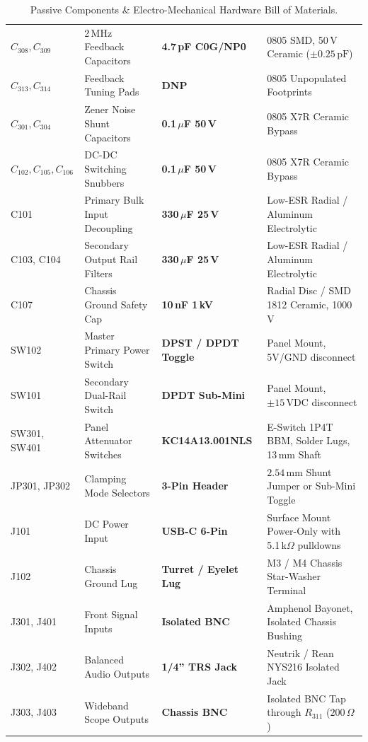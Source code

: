 \documentclass[11pt, letterpaper]{article}
\begin{document}
\begin{table}[H]
\begin{tabularx}{\linewidth}{@{} l l l L @{}}
        $C_{308}, C_{309}$ & 2\,MHz Feedback Capacitors & \textbf{4.7\,pF C0G/NP0} & 0805 SMD, 50\,V Ceramic ($\pm 0.25\,\text{pF}$) \\
        $C_{313}, C_{314}$ & Feedback Tuning Pads & \textbf{DNP} & 0805 Unpopulated Footprints \\
        $C_{301}, C_{304}$ & Zener Noise Shunt Capacitors & \textbf{0.1\,$\mu$F 50\,V} & 0805 X7R Ceramic Bypass \\
        $C_{102}, C_{105}, C_{106}$ & DC-DC Switching Snubbers & \textbf{0.1\,$\mu$F 50\,V} & 0805 X7R Ceramic Bypass \\
        C101 & Primary Bulk Input Decoupling & \textbf{330\,$\mu$F 25\,V} & Low-ESR Radial / Aluminum Electrolytic \\
        C103, C104 & Secondary Output Rail Filters & \textbf{330\,$\mu$F 25\,V} & Low-ESR Radial / Aluminum Electrolytic \\
        C107 & Chassis Ground Safety Cap & \textbf{10\,nF 1\,kV} & Radial Disc / SMD 1812 Ceramic, 1000\,V \\
        SW102 & Master Primary Power Switch & \textbf{DPST / DPDT Toggle} & Panel Mount, 5V/GND disconnect \\
        SW101 & Secondary Dual-Rail Switch & \textbf{DPDT Sub-Mini} & Panel Mount, $\pm 15\,\text{VDC}$ disconnect \\
        SW301, SW401 & Panel Attenuator Switches & \textbf{KC14A13.001NLS} & E-Switch 1P4T BBM, Solder Lugs, 13\,mm Shaft \\
        JP301, JP302 & Clamping Mode Selectors & \textbf{3-Pin Header} & $2.54\,\text{mm}$ Shunt Jumper or Sub-Mini Toggle \\
        J101 & DC Power Input & \textbf{USB-C 6-Pin} & Surface Mount Power-Only with 5.1\,k$\Omega$ pulldowns \\
        J102 & Chassis Ground Lug & \textbf{Turret / Eyelet Lug} & M3 / M4 Chassis Star-Washer Terminal \\
        J301, J401 & Front Signal Inputs & \textbf{Isolated BNC} & Amphenol Bayonet, Isolated Chassis Bushing \\
        J302, J402 & Balanced Audio Outputs & \textbf{1/4'' TRS Jack} & Neutrik / Rean NYS216 Isolated Jack \\
        J303, J403 & Wideband Scope Outputs & \textbf{Chassis BNC} & Isolated BNC Tap through $R_{311}$ ($200\,\Omega$) \\
        \bottomrule
    \end{tabularx}
    \caption{Passive Components \& Electro-Mechanical Hardware Bill of Materials.}
    \label{tab:bom_passive}
\end{table}
\end{document}
